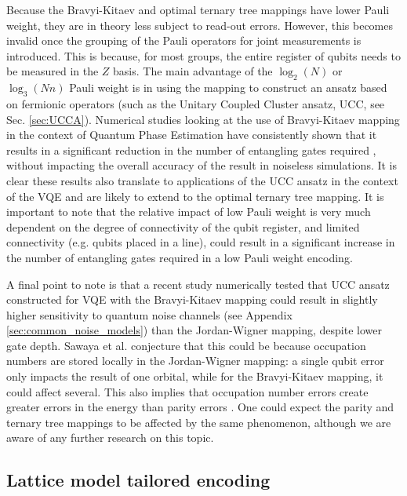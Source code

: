 Because the Bravyi-Kitaev and optimal ternary tree mappings have lower Pauli weight, they are in theory less subject to read-out errors. However, this becomes invalid once the grouping of the Pauli operators for joint measurements is introduced. This is because, for most groups, the entire register of qubits needs to be measured in the $Z$ basis. The main advantage of the $\log_2(N)$ or $\log_3(Nn)$ Pauli weight is in using the mapping to construct an ansatz based on fermionic operators (such as the Unitary Coupled Cluster ansatz, UCC, see Sec. \ref{sec:UCCA}). Numerical studies looking at the use of Bravyi-Kitaev mapping in the context of Quantum Phase Estimation have consistently shown that it results in a significant reduction in the number of entangling gates required \cite{Tranter2015, Tranter2018, Setia2018}, without impacting the overall accuracy of the result in noiseless simulations. It is clear these results also translate to applications of the UCC ansatz in the context of the VQE and are likely to extend to the optimal ternary tree mapping. It is important to note that the relative impact of low Pauli weight is very much dependent on the degree of connectivity of the qubit register, and limited connectivity (e.g. qubits placed in a line), could result in a significant increase in the number of entangling gates required in a low Pauli weight encoding.

A final point to note is that a recent study \cite{Sawaya2016} numerically tested that UCC ansatz constructed for VQE with the Bravyi-Kitaev mapping could result in slightly higher sensitivity to quantum noise channels (see Appendix \ref{sec:common_noise_models}) than the Jordan-Wigner mapping, despite lower gate depth. Sawaya et al.\cite{Sawaya2016} conjecture that this could be because occupation numbers are stored locally in the Jordan-Wigner mapping: a single qubit error only impacts the result of one orbital, while for the Bravyi-Kitaev mapping, it could affect several. This also implies that occupation number errors create greater errors in the energy than parity errors \cite{Sawaya2016}. One could expect the parity and ternary tree mappings to be affected by the same phenomenon, although we are aware of any further research on this topic. 

    
\subsection{Lattice model tailored encoding} \label{sec:lattice_encoding}

